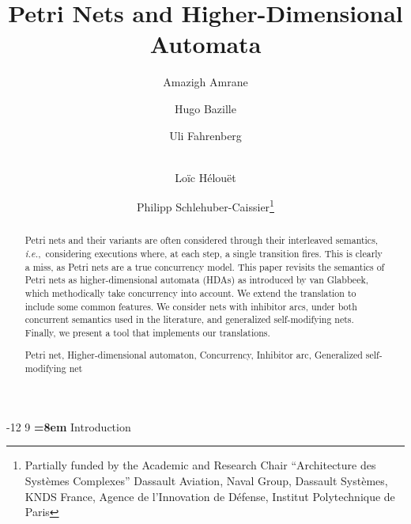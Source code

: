 \documentclass[runningheads,envcountsame]{llncs}
\makeatletter
\newcommand*\ie{\textit{i.e.},}
\renewcommand\section{\@startsection{section}{1}{\z@}%
  {-12\p@ \@plus -3\p@ \@minus -3\p@}%
  {9\p@ \@plus 3\p@ \@minus 3\p@}%
  {\normalfont\large\bfseries\boldmath
    \rightskip=\z@ \@plus 8em\pretolerance=10000 }}
\makeatother
\begin{document}
\title{Petri Nets and Higher-Dimensional Automata}

\author{%
  Amazigh Amrane \and
  Hugo Bazille \and
  Uli Fahrenberg \and \\
  Loïc Hélouët \and
  Philipp Schlehuber-Caissier\thanks{%
    Partially funded by the Academic and Research Chair ``Architecture des Systèmes Complexes''
    Dassault Aviation, Naval Group, Dassault Systèmes, KNDS
    France, Agence de l'Innovation de Défense, Institut Polytechnique de Paris}
}



\maketitle

\begin{abstract}
  Petri nets and their variants are often considered through their interleaved semantics,
  \ie~considering executions where, at each step, a single transition fires.
  This is clearly a miss, as Petri nets are a true concurrency model.
  This paper revisits the semantics of Petri nets as higher-dimensional automata (HDAs) as introduced by van Glabbeek,
  which methodically take concurrency into account.
  We extend the translation to include some common features.
  We consider nets with inhibitor arcs,
  under both concurrent semantics used in the literature,
  and generalized self-modifying nets.
  Finally, we present a tool that implements our translations.
  \begin{keywords}
    Petri net,
    Higher-dimensional automaton,
    Concurrency,
    Inhibitor arc,
    Generalized self-modifying net
  \end{keywords}
\end{abstract}

\section{Introduction}
\end{document}

